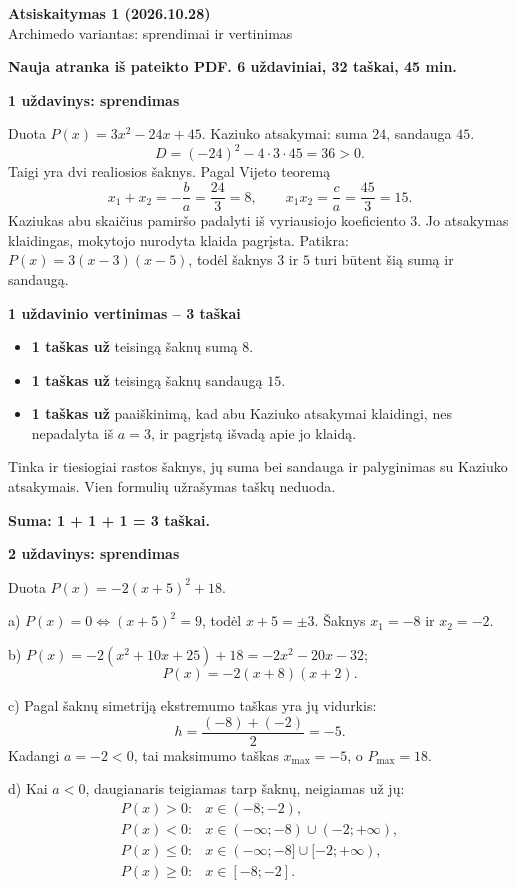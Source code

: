 \documentclass[11pt]{article}
\newcommand{\sk}[1]{\par\medskip\textbf{#1}\par}
\begin{document}
\setlength{\abovedisplayskip}{6pt}\setlength{\belowdisplayskip}{6pt}
\begin{center}\Large\textbf{Atsiskaitymas 1 (2026.10.28)}\\\large Archimedo variantas: sprendimai ir vertinimas\end{center}
\textbf{Nauja atranka iš pateikto PDF. 6 uždaviniai, 32 taškai, 45 min.}

\sk{1 uždavinys: sprendimas}
Duota $P(x)=3 x^{2} - 24 x + 45$. Kaziuko atsakymai: suma $24$, sandauga $45$.
\[D=(-24)^2-4\cdot3\cdot45=36>0.\]
Taigi yra dvi realiosios šaknys. Pagal Vijeto teoremą
\[x_1+x_2=-\frac ba=\frac{24}3=8,\qquad x_1x_2=\frac ca=\frac{45}3=15.\]
Kaziukas abu skaičius pamiršo padalyti iš vyriausiojo koeficiento $3$. Jo atsakymas klaidingas, mokytojo nurodyta klaida pagrįsta. Patikra: $P(x)=3(x-3)(x-5)$, todėl šaknys $3$ ir $5$ turi būtent šią sumą ir sandaugą.

\sk{1 uždavinio vertinimas -- 3 taškai}
\begin{itemize}
\item \textbf{1 taškas už} teisingą šaknų sumą $8$.
\item \textbf{1 taškas už} teisingą šaknų sandaugą $15$.
\item \textbf{1 taškas už} paaiškinimą, kad abu Kaziuko atsakymai klaidingi, nes nepadalyta iš $a=3$, ir pagrįstą išvadą apie jo klaidą.
\end{itemize}
Tinka ir tiesiogiai rastos šaknys, jų suma bei sandauga ir palyginimas su Kaziuko atsakymais. Vien formulių užrašymas taškų neduoda.\par\textbf{Suma: 1 + 1 + 1 = 3 taškai.}

\sk{2 uždavinys: sprendimas}
Duota $P(x)=-2(x+5)^2+18$.
\par a) $P(x)=0\iff (x+5)^2=9$, todėl $x+5=\pm3$. Šaknys $x_1=-8$ ir $x_2=-2$.
\par b) $P(x)=-2(x^2+10x+25)+18=- 2 x^{2} - 20 x - 32$;
\[P(x)=-2(x+8)(x+2).\]
\par c) Pagal šaknų simetriją ekstremumo taškas yra jų vidurkis:
\[h=\frac{(-8)+(-2)}2=-5.\]
Kadangi $a=-2<0$, tai maksimumo taškas $x_{\max}=-5$, o $P_{\max}=18$.
\par d) Kai $a<0$, daugianaris teigiamas tarp šaknų, neigiamas už jų:
\[\begin{array}{ll}P(x)>0:&x\in(-8;-2),\\P(x)<0:&x\in(-\infty;-8)\cup(-2;+\infty),\\P(x)\le0:&x\in(-\infty;-8]\cup[-2;+\infty),\\P(x)\ge0:&x\in[-8;-2].\end{array}\]
\newpage
\end{document}
